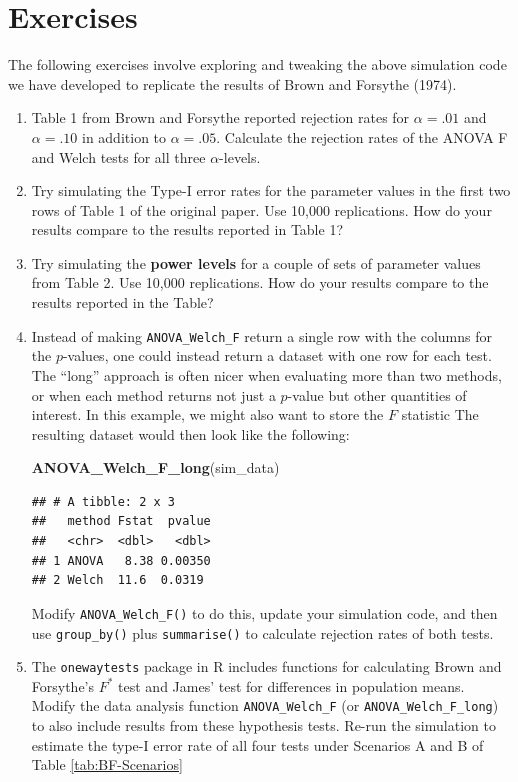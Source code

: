 \documentclass[
]{book}
\newenvironment{Shaded}{\begin{snugshade}}{\end{snugshade}}
\newcommand{\FunctionTok}[1]{\textcolor[rgb]{0.13,0.29,0.53}{\textbf{#1}}}
\newcommand{\NormalTok}[1]{#1}
\begin{document}
\section{Exercises}\label{exAnovaExercises}

The following exercises involve exploring and tweaking the above simulation code we have developed to replicate the results of Brown and Forsythe (1974).

\begin{enumerate}
\def\labelenumi{\arabic{enumi}.}
\item
  Table 1 from Brown and Forsythe reported rejection rates for \(\alpha = .01\) and \(\alpha = .10\) in addition to \(\alpha = .05\). Calculate the rejection rates of the ANOVA F and Welch tests for all three \(\alpha\)-levels.
\item
  Try simulating the Type-I error rates for the parameter values in the first two rows of Table 1 of the original paper. Use 10,000 replications. How do your results compare to the results reported in Table 1?
\item
  Try simulating the \textbf{power levels} for a couple of sets of parameter values from Table 2. Use 10,000 replications. How do your results compare to the results reported in the Table?
\item
  Instead of making \texttt{ANOVA\_Welch\_F} return a single row with the columns for the \(p\)-values, one could instead return a dataset with one row for each test. The ``long'' approach is often nicer when evaluating more than two methods, or when each method returns not just a \(p\)-value but other quantities of interest. In this example, we might also want to store the \(F\) statistic The resulting dataset would then look like the following:

\begin{Shaded}
\begin{Highlighting}[]
\FunctionTok{ANOVA\_Welch\_F\_long}\NormalTok{(sim\_data)}
\end{Highlighting}
\end{Shaded}

\begin{verbatim}
## # A tibble: 2 x 3
##   method Fstat  pvalue
##   <chr>  <dbl>   <dbl>
## 1 ANOVA   8.38 0.00350
## 2 Welch  11.6  0.0319
\end{verbatim}

  Modify \texttt{ANOVA\_Welch\_F()} to do this, update your simulation code, and then use \texttt{group\_by()} plus \texttt{summarise()} to calculate rejection rates of both tests.
\item
  The \texttt{onewaytests} package in R includes functions for calculating Brown and Forsythe's \(F^*\) test and James' test for differences in population means. Modify the data analysis function \texttt{ANOVA\_Welch\_F} (or \texttt{ANOVA\_Welch\_F\_long}) to also include results from these hypothesis tests. Re-run the simulation to estimate the type-I error rate of all four tests under Scenarios A and B of Table \ref{tab:BF-Scenarios}
\end{enumerate}
\end{document}
